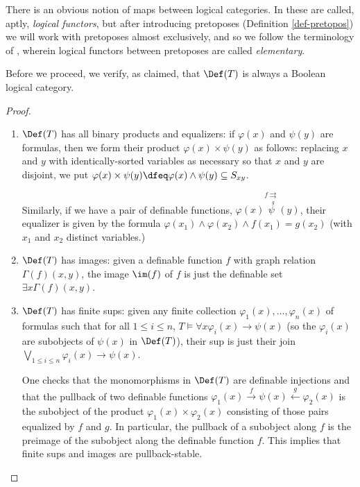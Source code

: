  There is an obvious notion of maps between logical categories. In \cite{makkai-reyes} these are called, aptly, \emph{logical functors}, but after introducing pretoposes (Definition \ref{def-pretopos}) we will work with pretoposes almost exclusively, and so we follow the terminology of \cite{makkai-sdfol}, wherein logical functors between pretoposes are called \emph{elementary}.


 Before we proceed, we verify, as claimed, that $\Def(T)$ is always a Boolean logical category.


 \begin{proof}
   \begin{enumerate}
   \item $\Def(T)$ has all binary products and equalizers: if $\varphi(x)$ and $\psi(y)$ are formulas, then we form their product $\varphi(x) \times \psi(y)$ as follows: replacing $x$ and $y$ with identically-sorted variables as necessary so that $x$ and $y$ are disjoint, we put $\varphi(x) \times \psi(y) \dfeq \varphi(x) \land \psi(y) \subseteq S_{xy}$.

     Similarly, if we have a pair of definable functions, $\varphi(x) \overset{f \underset{g}{\rightrightarrows}} \psi(y)$, their equalizer is given by the formula $\varphi(x_1) \land \varphi(x_2) \land f(x_1) = g(x_2)$ (with $x_1$ and $x_2$ distinct variables.)

\item $\Def(T)$ has images: given a definable function $f$ with graph relation $\Gamma(f)(x,y)$, the image $\im(f)$ of $f$ is just the definable set $\exists x \Gamma(f)(x, y)$.
     
\item $\Def(T)$ has finite sups: given any finite collection $\varphi_1(x), \dots, \varphi_n(x)$ of formulas such that for all $1 \leq i \leq n$, $T \models \forall x \varphi_i(x) \rightarrow  \psi(x)$ (so the $\varphi_i(x)$ are subobjects of $\psi(x)$ in $\Def(T)$), their sup is just their join $\bigvee_{1 \leq i \leq n} \varphi_i(x) \rightarrow \psi(x)$.

One checks that the monomorphisms in $\Def(T)$ are definable injections and that the pullback of two definable functions $\varphi_1(x) \overset{f}{\longrightarrow} \psi(x) \overset{g}{\longleftarrow} \varphi_2(x)$ is the subobject of the product $\varphi_1(x) \times \varphi_2(x)$ consisting of those pairs equalized by $f$ and $g$. In particular, the pullback of a subobject along $f$ is the preimage of the subobject along the definable function $f$. This implies that finite sups and images are pullback-stable.
     \end{enumerate}
 \end{proof}


